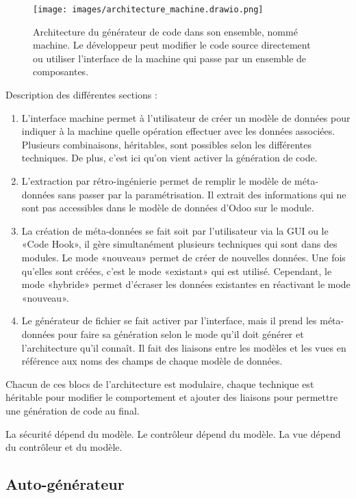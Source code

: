 \begin{figure}
\centering
\texttt{[image: images/architecture\_machine.drawio.png]}
\caption{Architecture du générateur de code dans son ensemble, nommé machine. Le développeur peut modifier le code source directement ou utiliser l'interface de la machine qui passe par un ensemble de composantes.}
\label{fig:dia_architecture}
\end{figure}

Description des différentes sections : 
\begin{enumerate}
    \item L’interface machine permet à l’utilisateur de créer un modèle de données pour indiquer à la machine quelle opération effectuer avec les données associées. Plusieurs combinaisons, héritables, sont possibles selon les différentes techniques. De plus, c’est ici qu’on vient activer la génération de code.
    \item L’extraction par rétro-ingénierie permet de remplir le modèle de méta-données sans passer par la paramétrisation. Il extrait des informations qui ne sont pas accessibles dans le modèle de données d’Odoo sur le module.
    \item La création de méta-données se fait soit par l’utilisateur via la GUI ou le «Code Hook», il gère simultanément plusieurs techniques qui sont dans des modules. Le mode «nouveau» permet de créer de nouvelles données. Une fois qu’elles sont créées, c’est le mode «existant» qui est utilisé. Cependant, le mode «hybride» permet d’écraser les données existantes en réactivant le mode «nouveau».
    \item Le générateur de fichier se fait activer par l’interface, mais il prend les méta-données pour faire sa génération selon le mode qu’il doit générer et l’architecture qu’il connaît. Il fait des liaisons entre les modèles et les vues en référence aux noms des champs de chaque modèle de données.
\end{enumerate}

Chacun de ces blocs de l’architecture est modulaire, chaque technique est héritable pour modifier le comportement et ajouter des liaisons pour permettre une génération de code au final.

La sécurité dépend du modèle. Le contrôleur dépend du modèle. La vue dépend du contrôleur et du modèle.

\subsection{Auto-générateur}

